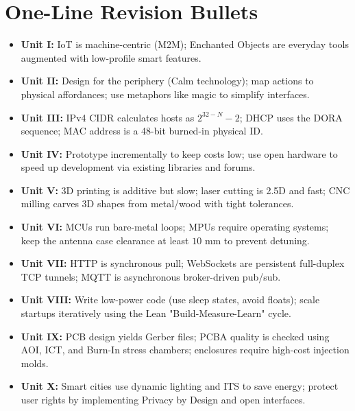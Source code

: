 \section{One-Line Revision Bullets}

\begin{itemize}
  \item   \textbf{Unit I:} IoT is machine-centric (M2M); Enchanted Objects are everyday tools augmented with low-profile smart features.
  \item   \textbf{Unit II:} Design for the periphery (Calm technology); map actions to physical affordances; use metaphors like magic to simplify interfaces.
  \item   \textbf{Unit III:} IPv4 CIDR calculates hosts as $2^{32-N}-2$; DHCP uses the DORA sequence; MAC address is a 48-bit burned-in physical ID.
  \item   \textbf{Unit IV:} Prototype incrementally to keep costs low; use open hardware to speed up development via existing libraries and forums.
  \item   \textbf{Unit V:} 3D printing is additive but slow; laser cutting is 2.5D and fast; CNC milling carves 3D shapes from metal/wood with tight tolerances.
  \item   \textbf{Unit VI:} MCUs run bare-metal loops; MPUs require operating systems; keep the antenna case clearance at least $10\text{ mm}$ to prevent detuning.
  \item   \textbf{Unit VII:} HTTP is synchronous pull; WebSockets are persistent full-duplex TCP tunnels; MQTT is asynchronous broker-driven pub/sub.
  \item   \textbf{Unit VIII:} Write low-power code (use sleep states, avoid floats); scale startups iteratively using the Lean "Build-Measure-Learn" cycle.
  \item   \textbf{Unit IX:} PCB design yields Gerber files; PCBA quality is checked using AOI, ICT, and Burn-In stress chambers; enclosures require high-cost injection molds.
  \item   \textbf{Unit X:} Smart cities use dynamic lighting and ITS to save energy; protect user rights by implementing Privacy by Design and open interfaces.
\end{itemize}

